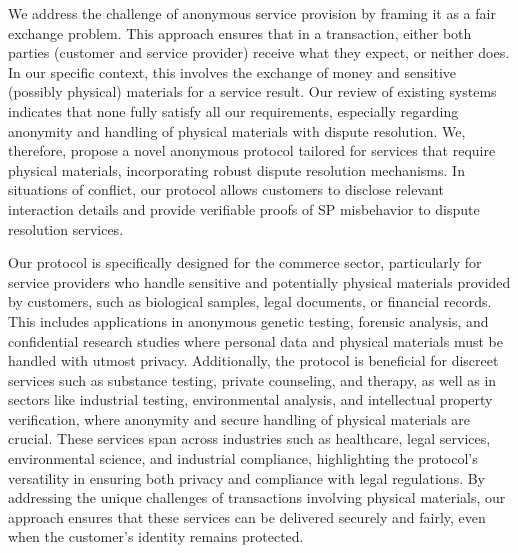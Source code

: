 \documentclass[pdftex,twocolumn,epjc3]{svjour3}
\begin{document}
\begin{sloppypar}
We address the challenge of anonymous service provision by framing it as a fair exchange problem. This approach ensures that in a transaction, either both parties (customer and service provider) receive what they expect, or neither does. In our specific context, this involves the exchange of money and sensitive (possibly physical) materials for a service result. Our review of existing systems indicates that none fully satisfy all our requirements, especially regarding anonymity and handling of physical materials with dispute resolution. We, therefore, propose a novel anonymous protocol tailored for services that require physical materials, incorporating robust dispute resolution mechanisms. In situations of conflict, our protocol allows customers to disclose relevant interaction details and provide verifiable proofs of SP misbehavior to dispute resolution services.
\end{sloppypar}

\begin{sloppypar}
Our protocol is specifically designed for the commerce sector, particularly for service providers who handle sensitive and potentially physical materials provided by customers, such as biological samples, legal documents, or financial records. This includes applications in anonymous genetic testing, forensic analysis, and confidential research studies where personal data and physical materials must be handled with utmost privacy. Additionally, the protocol is beneficial for discreet services such as substance testing, private counseling, and therapy, as well as in sectors like industrial testing, environmental analysis, and intellectual property verification, where anonymity and secure handling of physical materials are crucial. These services span across industries such as healthcare, legal services, environmental science, and industrial compliance, highlighting the protocol's versatility in ensuring both privacy and compliance with legal regulations. By addressing the unique challenges of transactions involving physical materials, our approach ensures that these services can be delivered securely and fairly, even when the customer's identity remains protected.
\end{sloppypar}
\end{document}
